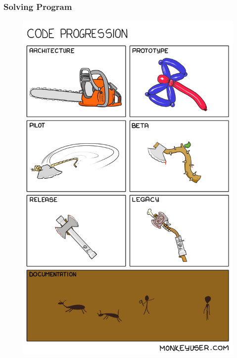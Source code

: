 \documentclass{../c-lecture}
\begin{document}
\begin{frame}
  \frametitle{Solving Program}
  \begin{figure}
  \includegraphics[height=.75\textheight]{./img/code-progress.png}
  \end{figure}
\end{frame}
\end{document}
